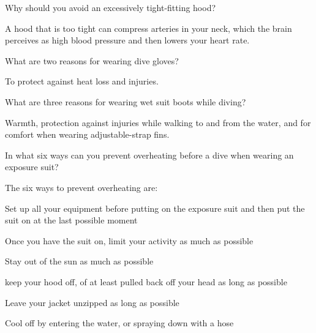 	\begin{qanda}
		\begin{question}
Why should you avoid an excessively tight-fitting hood?
		\end{question}

		\begin{answer}
A hood that is too tight can compress arteries in your neck, which the brain perceives as high blood pressure and then lowers your heart rate.
		\end{answer}
	\end{qanda}

	\begin{qanda}
		\begin{question}
What are two reasons for wearing dive gloves?
		\end{question}

		\begin{answer}
To protect against heat loss and injuries.
		\end{answer}
	\end{qanda}

	\begin{qanda}
		\begin{question}
What are three reasons for wearing wet suit boots while diving?
		\end{question}

		\begin{answer}
Warmth, protection against injuries while walking to and from the water, and for comfort when wearing adjustable-strap fins.
		\end{answer}
	\end{qanda}

	\begin{qanda}
		\begin{question}
In what six ways can you prevent overheating before a dive when wearing an exposure suit?
		\end{question}

		\begin{answer}
The six ways to prevent overheating are:
			\begin{nospacenumberedlist}
				\item Set up all your equipment before putting on the exposure suit and then put the suit on at the last possible moment
				\item Once you have the suit on, limit your activity as much as possible
				\item Stay out of the sun as much as possible
				\item keep your hood off, of at least pulled back off your head as long as possible
				\item Leave your jacket unzipped as long as possible
				\item Cool off by entering the water, or spraying down with a hose
			\end{nospacenumberedlist}
		\end{answer}
	\end{qanda}

